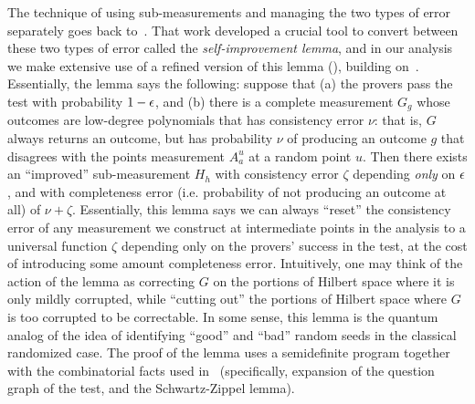 The technique of using sub-measurements and managing the two types of
error separately goes back to~\cite{IV12}. That work developed a
crucial tool to convert between these two types of error called the
\emph{self-improvement lemma}, and in our analysis we make extensive
use of a refined version of this lemma (), building on~\cite{Vid16,NV18b}. Essentially, the lemma says the
following: suppose that (a) the provers pass the test with probability
$1 - \epsilon$, and (b) there is a complete measurement $G_{g}$ whose
outcomes are low-degree polynomials that has
consistency error $\nu$: that is, $G$ always returns an outcome, but
has probability $\nu$ of producing an outcome $g$ that disagrees with the points measurement $A^u_a$ at a
random point $u$. Then there exists an
``improved'' sub-measurement  $H_{h}$ with consistency error $\zeta$
depending \emph{only} on $\epsilon$, and with completeness error
(i.e. probability of not producing an outcome at all) of $\nu
+\zeta$. Essentially, this lemma says we can always ``reset'' the
consistency error of any measurement we construct at intermediate
points in the analysis to a universal
function $\zeta$ depending only on the provers' success in the test,
at the cost of introducing some amount completeness error. Intuitively, one may
think of the action of the lemma as correcting $G$ on the portions of
Hilbert space where it is only mildly corrupted, while ``cutting out'' the
portions of Hilbert space where $G$ is too corrupted to be
correctable. In some sense, this lemma is the quantum analog of the
idea of identifying ``good'' and ``bad'' random seeds in the classical
randomized case. The proof of the lemma uses a semidefinite program
together with the combinatorial facts used in~\cite{BFL91}
(specifically, expansion of the question graph of the test, and
the Schwartz-Zippel lemma).

